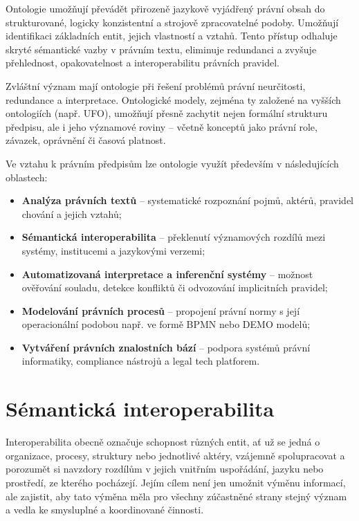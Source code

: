 Ontologie umožňují převádět přirozeně jazykově vyjádřený právní obsah do strukturované, logicky konzistentní a strojově zpracovatelné podoby. Umožňují identifikaci základních entit, jejich vlastností  a vztahů. Tento přístup odhaluje skryté sémantické vazby v právním textu, eliminuje redundanci a zvyšuje přehlednost, opakovatelnost a interoperabilitu právních pravidel. \cite{Benjamins2005}

Zvláštní význam mají ontologie při řešení problémů právní neurčitosti, redundance a interpretace. Ontologické modely, zejména ty založené na vyšších ontologiích (např. UFO), umožňují přesně zachytit nejen formální strukturu předpisu, ale i jeho významové roviny – včetně konceptů jako právní role, závazek, oprávnění či časová platnost.

Ve vztahu k právním předpisům lze ontologie využít především v následujících oblastech:
\begin{itemize}
  \item \textbf{Analýza právních textů} – systematické rozpoznání pojmů, aktérů, pravidel chování a jejich vztahů;
  \item \textbf{Sémantická interoperabilita} – překlenutí významových rozdílů mezi systémy, institucemi a jazykovými verzemi;
  \item \textbf{Automatizovaná interpretace a inferenční systémy} – možnost ověřování souladu, detekce konfliktů či odvozování implicitních pravidel;
  \item \textbf{Modelování právních procesů} – propojení právní normy s její operacionální podobou např. ve formě BPMN nebo DEMO modelů;
  \item \textbf{Vytváření právních znalostních bází} – podpora systémů právní informatiky, compliance nástrojů a legal tech platforem. \cite{VanEngers2008,Benjamins2005}
\end{itemize}



\section{Sémantická interoperabilita}
\label{sec:semantická-interoperabilita}
Interoperabilita obecně označuje schopnost různých entit, ať už se jedná o organizace, procesy, struktury nebo jednotlivé aktéry, vzájemně spolupracovat a porozumět si navzdory rozdílům v jejich vnitřním uspořádání, jazyku nebo prostředí, ze kterého pocházejí. Jejím cílem není jen umožnit výměnu informací, ale zajistit, aby tato výměna měla pro všechny zúčastněné strany stejný význam a vedla ke smysluplné a koordinované činnosti. \cite{sdeleni_interoperabilita,Bittner2006}

